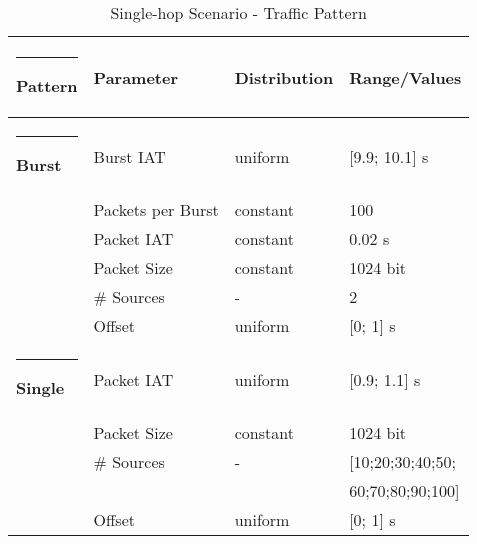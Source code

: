 \begin{table}[htb]
		\centering
		\caption{Single-hop Scenario - Traffic Pattern \label{t:traffic}}
			
		\begin{tabular}{l@{~}l@{\,\,}l@{\,\,}l} \hline \rule{-2pt}{12pt}
			Pattern& Parameter & Distribution & Range/Values  \rule{0pt}{12pt} \\ \hline \rule{-2pt}{12pt}  
      \textbf{Burst}      
      & Burst IAT         & uniform  & [9.9; 10.1] s\\ 
      & Packets per Burst & constant & 100\\
      & Packet IAT        & constant & 0.02 s\\
      & Packet Size       & constant & 1024 bit\\
      & \# Sources & -        & 2\\
			& Offset						& uniform  & [0; 1] s\\ 
      \hline      \hline\rule{-2pt}{12pt} 
      \textbf{Single}     & Packet IAT        & uniform  & [0.9; 1.1] s\\
      & Packet Size       & constant & 1024 bit\\
      & \# Sources & -        & [10;20;30;40;50;\\
      & & & 60;70;80;90;100]\\
			& Offset						& uniform  & [0; 1] s\\ 
      \hline
    \end{tabular}
\end{table}
